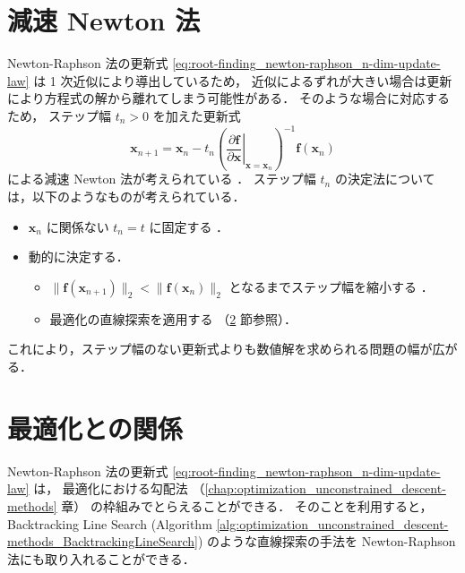 \section{減速 Newton 法}

Newton-Raphson 法の更新式
\eqref{eq:root-finding_newton-raphson_n-dim-update-law}
は 1 次近似により導出しているため，
近似によるずれが大きい場合は更新により方程式の解から離れてしまう可能性がある．
そのような場合に対応するため，
ステップ幅 $t_n > 0$ を加えた更新式
\begin{equation}
    \bm{x}_{n+1} = \bm{x}_n
    - t_n \left( \left.\frac{\partial \bm{f}}{\partial \bm{x}}\right|_{\bm{x}=\bm{x}_n} \right)^{-1}
    \bm{f}(\bm{x}_n)
    \label{eq:root-finding_deaccelerated-newton-raphson_n-dim-update-law}
\end{equation}
による減速 Newton 法が考えられている
\cite[6.6 節]{Togawa2007}．
ステップ幅 $t_n$ の決定法については，以下のようなものが考えられている．
\begin{itemize}
    \item $\bm{x}_n$ に関係ない $t_n = t$ に固定する
          \cite[6.6 節]{Togawa2007}．
    \item 動的に決定する．
          \begin{itemize}
              \item $\|\bm{f}(\bm{x}_{n+1})\|_2 < \|\bm{f}(\bm{x}_{n})\|_2$
                    となるまでステップ幅を縮小する
                    \cite[6.6 節]{Togawa2007}．
              \item 最適化の直線探索を適用する
                    （\ref{sec:root-finding_newton-raphson_relation-to-optimization} 節参照）．
          \end{itemize}
\end{itemize}

これにより，ステップ幅のない更新式よりも数値解を求められる問題の幅が広がる．

\section{最適化との関係}
\label{sec:root-finding_newton-raphson_relation-to-optimization}

Newton-Raphson 法の更新式
\eqref{eq:root-finding_newton-raphson_n-dim-update-law} は，
最適化における勾配法
（\ref{chap:optimization_unconstrained_descent-methods} 章）
の枠組みでとらえることができる．
そのことを利用すると，
Backtracking Line Search
(Algorithm \ref{alg:optimization_unconstrained_descent-methods_BacktrackingLineSearch})
のような直線探索の手法を Newton-Raphson 法にも取り入れることができる．


